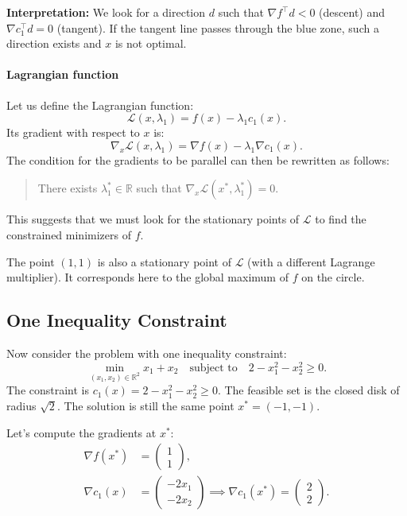 \begin{figureexplanation}
\textbf{Interpretation:} We look for a direction $d$ such that $\nabla f^\top d < 0$ (descent) and $\nabla c_1^\top d = 0$ (tangent). If the tangent line passes through the blue zone, such a direction exists and $x$ is not optimal.
\end{figureexplanation}

\paragraph{Lagrangian function}
Let us define the Lagrangian function:
\begin{equation}
    \mathcal{L}(x, \lambda_1) = f(x) - \lambda_1 c_1(x).
\end{equation}
Its gradient with respect to $x$ is:
\begin{equation}
    \nabla_x \mathcal{L}(x, \lambda_1) = \nabla f(x) - \lambda_1 \nabla c_1(x).
\end{equation}
The condition for the gradients to be parallel can then be rewritten as follows:
\begin{quote}
There exists $\lambda_1^* \in \mathbb{R}$ such that $\nabla_x \mathcal{L}(x^*, \lambda_1^*) = 0$.
\end{quote}
This suggests that we must look for the stationary points of $\mathcal{L}$ to find the constrained minimizers of $f$.

\begin{remarque}
The point $(1, 1)$ is also a stationary point of $\mathcal{L}$ (with a different Lagrange multiplier). It corresponds here to the global maximum of $f$ on the circle.
\end{remarque}

\subsection{One Inequality Constraint}

Now consider the problem with one inequality constraint:
\begin{equation}
    \min_{(x_1, x_2) \in \mathbb{R}^2} x_1 + x_2 \quad \text{subject to} \quad 2 - x_1^2 - x_2^2 \geq 0.
\end{equation}
The constraint is $c_1(x) = 2 - x_1^2 - x_2^2 \geq 0$. The feasible set is the closed disk of radius $\sqrt{2}$. The solution is still the same point $x^* = (-1, -1)$.

Let's compute the gradients at $x^*$:
\begin{align*}
    \nabla f(x^*) &= \begin{pmatrix} 1 \\ 1 \end{pmatrix}, \\
    \nabla c_1(x) &= \begin{pmatrix} -2x_1 \\ -2x_2 \end{pmatrix} \implies \nabla c_1(x^*) = \begin{pmatrix} 2 \\ 2 \end{pmatrix}.
\end{align*}

